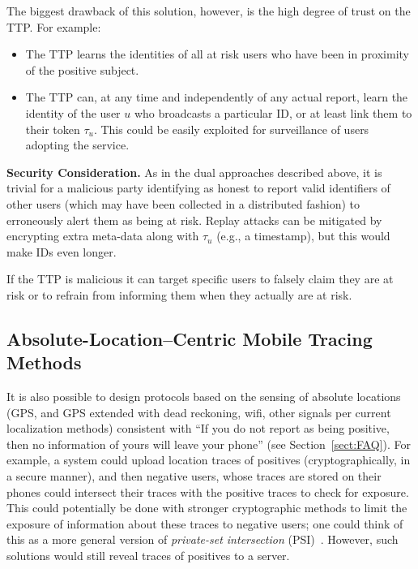 \documentclass{article}
\begin{document}
The biggest drawback of this solution, however, is the high degree of trust on the TTP. For example:
\begin{itemize}
    \item The TTP learns the identities of all at risk users who have been in proximity of the positive subject.  
    \item The TTP can, at any time and independently of any actual report, learn the identity of the user $u$ who broadcasts a particular ID, or at least link them to their token $\tau_u$. This could be easily exploited for surveillance of users adopting the service.
\end{itemize}

{\bf Security Consideration.} As in the dual approaches described above, it is trivial for a malicious party identifying as honest to report valid identifiers of other users (which may have been collected in a distributed fashion) to erroneously alert them as being at risk. Replay attacks can be mitigated by encrypting extra meta-data along with $\tau_u$ (e.g., a timestamp), but this would make IDs even longer.

If the TTP is malicious it can target specific users to falsely claim they are at risk or to refrain from informing them when they actually are at risk.


\subsection{Absolute-Location--Centric Mobile Tracing Methods}\label{sect:GPS}
It is also possible to design protocols based on the sensing of absolute locations (GPS, and GPS extended with dead reckoning, wifi, other signals per current localization methods) consistent with ``If you do not report as being positive, then no information of yours will leave your phone'' (see Section~\ref{sect:FAQ}).  For example, a system could upload location traces of positives (cryptographically, in a secure manner), and then negative users, whose traces are stored on their phones could intersect their traces with the positive traces to check for exposure. This could potentially be done with stronger cryptographic methods to limit the exposure of information about these traces to negative users; one could think of this as a more general version of {\em private-set intersection} (PSI)~\cite{PSI,PSI2,PSI3}. However, such solutions would still reveal traces of positives to a server.  
\end{document}
